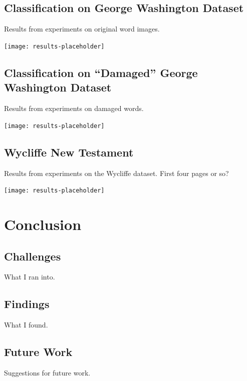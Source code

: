 \documentclass[final]{ukthesis}
\begin{document}
%
%
\section{Classification on George Washington Dataset}
Results from experiments on original word images.

\begin{center}
\texttt{[image: results-placeholder]}
\end{center}



%
%
\section{Classification on ``Damaged'' George Washington Dataset}
Results from experiments on damaged words.

\begin{center}
\texttt{[image: results-placeholder]}
\end{center}


%
%
\section{Wycliffe New Testament}
Results from experiments on the Wycliffe dataset. First four pages or so?

\begin{center}
\texttt{[image: results-placeholder]}
\end{center}





%
%
%
\chapter{Conclusion}

\section{Challenges}
What I ran into.

\section{Findings}
What I found.

\section{Future Work}
Suggestions for future work.
\end{document}
